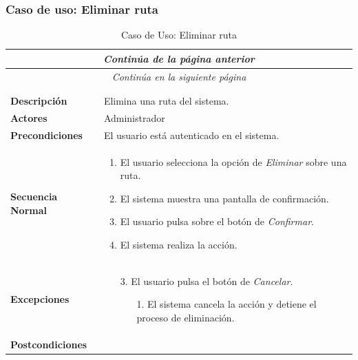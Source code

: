 \newpage
\subsubsection*{Caso de uso: Eliminar ruta }
\begin{longtable}{| p{4cm} | p{10cm} |}
\endfirsthead
\multicolumn{2}{c}{\textit{Continúa de la página anterior}}\\[12pt]
\hline
\endhead
\hline
\multicolumn{2}{c}{\textit{Continúa en la siguiente página}} \\
\endfoot
\hline
\caption{Caso de Uso: Eliminar ruta}\label{fig:1}\\
\endlastfoot


\hline
\multicolumn{2}{|c|}{\textbf{CU$<$29$>$ - Eliminar Ruta}} \\

\hline
\textbf{Descripción} &
Elimina una ruta del sistema.\\

\hline
\textbf{Actores} &
Administrador\\

\hline
\textbf{Precondiciones} &
El usuario está autenticado en el sistema.\\

\hline
\textbf{Secuencia Normal} &\mbox{}\par\vspace{-\baselineskip}
\begin{enumerate}[leftmargin=0.7cm, topsep=0.1cm]
\item El usuario selecciona la opción de \textit{Eliminar} sobre una ruta.
\item El sistema muestra una pantalla de confirmación.
\item El usuario pulsa sobre el botón de \textit{Confirmar}.
\item El sistema realiza la acción.
\end{enumerate}


\\
\hline
\textbf{Excepciones} &\mbox{}\par\vspace{-\baselineskip}
\begin{enumerate}[leftmargin=0.9cm, topsep=0.1cm]
\item[3.] El usuario pulsa el botón de \textit{Cancelar}.
	\begin{itemize}
	\item[1.] El sistema cancela la acción y detiene el proceso de eliminación.
	\end{itemize}
\end{enumerate}
\\

\hline
\textbf{Postcondiciones} & \\
\hline
\end{longtable}




